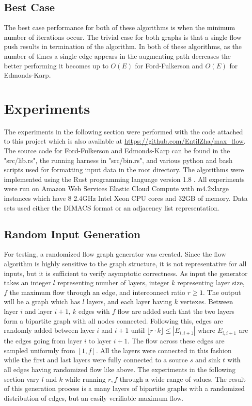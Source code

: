 \documentclass{article}
\begin{document}
\subsection{Best Case}
The best case performance for both of these algorithms is when the minimum number of iterations occur. The trivial case for both graphs is that a single flow push results in termination of the algorithm. In both of these algorithms, as the number of times a single edge appears in the augmenting path decreases the better performing it becomes up to $O(E)$ for Ford-Fulkerson and $O(E)$ for Edmonds-Karp.

\section{Experiments}
The experiments in the following section were performed with the code attached to this project which is also available at \url{https://github.com/EntilZha/max_flow}. The source code for Ford-Fulkerson and Edmonds-Karp can be found in the "src/lib.rs", the running harness in "src/bin.rs", and various python and bash scripts used for formatting input data in the root directory. The algorithms were implemented using the Rust programming language version 1.8 \cite{rust}. All experiments were run on Amazon Web Services Elastic Cloud Compute with m4.2xlarge instances which have 8 2.4GHz Intel Xeon CPU cores and 32GB of memory\cite{aws}. Data sets used either the DIMACS format or an adjacency list representation\cite{dimacs}.

\subsection{Random Input Generation}
For testing, a randomized flow graph generator was created. Since the flow algorithm is highly sensitive to the graph structure, it is not representative for all inputs, but it is sufficient to verify asymptotic correctness. As input the generator takes an integer $l$ representing number of layers, integer $k$ representing layer size, $f$ the maximum flow through an edge, and interconnect ratio $r\ge 1$. The output will be a graph which has $l$ layers, and each layer having $k$ vertexes. Between layer $i$ and layer $i+1$, $k$ edges with $f$ flow are added such that the two layers form a bipartite graph with all nodes connected. Following this, edges are randomly added between layer $i$ and $i+1$ until $\lfloor r\cdot k\rfloor\le |E_{i,i+1}|$ where $E_{i,i+1}$ are the edges going from layer $i$ to layer $i+1$. The flow across these edges are sampled uniformly from $[1,f]$. All the layers were connected in this fashion while the first and last layers were fully connected to a source $s$ and sink $t$ with all edges having randomized flow like above. The experiments in the following section vary $l$ and $k$ while running $r,f$ through a wide range of values. The result of this generation process is a many layers of bipartite graphs with a randomized distribution of edges, but an easily verifiable maximum flow.
\end{document}
